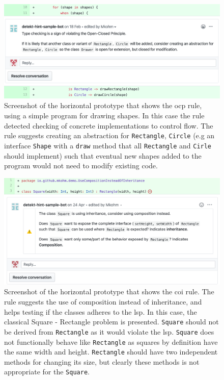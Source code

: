 \begin{figure}[h!]
    \centering
    \includegraphics[width=\textwidth]{images/comment_ocp2.png}
    \caption{Screenshot of the horizontal prototype that shows the \gls{ocp} rule, using a simple program for drawing shapes. In this case the rule detected checking of concrete implementations to control flow. The rule suggests creating an abstraction for \texttt{Rectangle}, \texttt{Circle} (e.g an interface \texttt{Shape} with a \texttt{draw} method that all \texttt{Rectangle} and \texttt{Cirle} should implement) such that eventual new shapes added to the program would not need to modify existing code. }
    \label{fig:ocp}
\end{figure}


\begin{figure}[h!]
    \centering
    \includegraphics[width=\textwidth]{images/horizontal-prototype-coh.png}
    \caption{Screenshot of the horizontal prototype that shows the \gls{coi} rule. The rule suggests the use of composition instead of inheritance, and helps testing if the classes adheres to the \gls{lsp}. In this case, the classical Square - Rectangle problem is presented. \texttt{Square} should not be derived from \texttt{Rectangle} as it would violate the \gls{lsp}. \texttt{Square} does not functionally behave like \texttt{Rectangle} as squares by definition have the same width and height. \texttt{Rectangle} should have two independent methods for changing its size, but clearly these methods is not appropriate for the \texttt{Square}. }
    \label{fig:liskov}
\end{figure}

